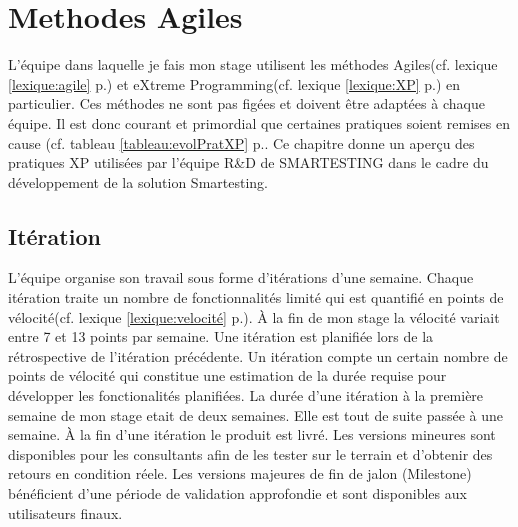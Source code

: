 \chapter{Methodes Agiles}\label{agile}
L'équipe dans laquelle je fais mon stage utilisent les méthodes Agiles(cf. lexique \ref{lexique:agile} p.\pageref{lexique:agile}) et eXtreme Programming(cf. lexique \ref{lexique:XP} p.\pageref{lexique:XP}) en particulier. Ces méthodes ne sont pas figées et doivent être adaptées à chaque équipe. Il est donc courant et primordial que certaines pratiques soient remises en cause (cf. tableau \ref{tableau:evolPratXP} p.\pageref{tableau:evolPratXP}. Ce chapitre donne un aperçu des pratiques XP utilisées par l'équipe R\&D de SMARTESTING dans le cadre du développement de la solution Smartesting.

\section{Itération}
L'équipe organise son travail sous forme d'itérations d'une semaine. Chaque itération traite un nombre de fonctionnalités limité qui est quantifié en points de vélocité(cf. lexique \ref{lexique:velocité} p.\pageref{lexique:velocité}). \`A la fin de mon stage la vélocité variait entre 7 et 13 points par semaine. Une itération est planifiée lors de la rétrospective de l'itération précédente. Un itération compte un certain nombre de points de vélocité qui constitue une estimation de la durée requise pour développer les fonctionalités planifiées. La durée d'une itération à la première semaine de mon stage etait de deux semaines. Elle est tout de suite passée à une semaine. \`A la fin d'une itération le produit est livré. Les versions mineures sont disponibles pour les consultants afin de les tester sur le terrain et d'obtenir des retours en condition réele. Les versions majeures de fin de jalon (Milestone) bénéficient d'une période de validation approfondie et sont disponibles aux utilisateurs finaux.

